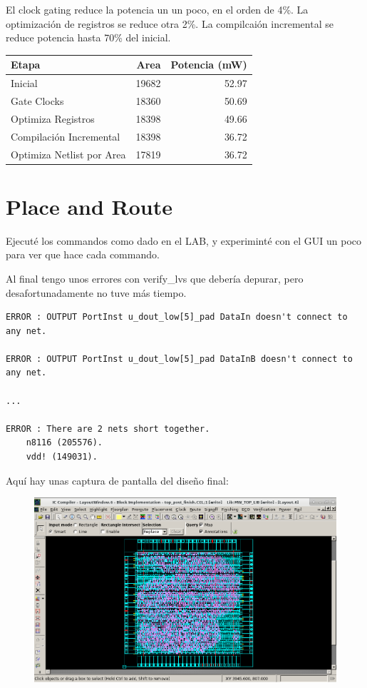 \documentclass[a4paper]{article}
\begin{document}
El clock gating reduce la potencia un un poco, en el orden de 4\%. La optimización de registros se reduce otra 2\%. La compilcaión incremental se reduce potencia hasta 70\% del inicial.

\begin{tabular}{| l | r | r |} \hline
Etapa & Area & Potencia (mW) \\ \hline
Inicial & 19682 & 52.97 \\
Gate Clocks & 18360 & 50.69 \\
Optimiza Registros & 18398 & 49.66 \\
Compilación Incremental & 18398 & 36.72 \\
Optimiza Netlist por Area & 17819 & 36.72 \\ \hline
\end{tabular}

\section{Place and Route}

Ejecuté los commandos como dado en el LAB, y experiminté con el GUI un poco para ver que hace cada commando.

Al final tengo unos errores con verify\_lvs que debería depurar, pero desafortunadamente no tuve más tiempo.

\begin{verbatim}
ERROR : OUTPUT PortInst u_dout_low[5]_pad DataIn doesn't connect to any net.

ERROR : OUTPUT PortInst u_dout_low[5]_pad DataInB doesn't connect to any net.

...

ERROR : There are 2 nets short together.
	n8116 (205576).
	vdd! (149031).
\end{verbatim}

Aquí hay unas captura de pantalla del diseño final:

\begin{figure}[!htb]
\centering
\includegraphics[scale=0.4]{./img/screenshot1}
\end{figure}
\end{document}
